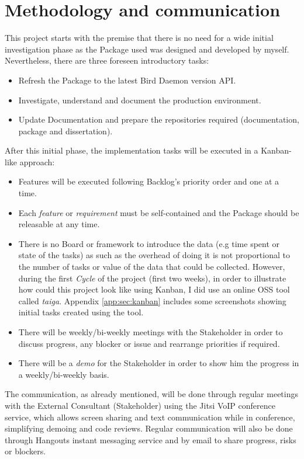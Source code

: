 \section{Methodology and communication}
This project starts with the premise that there is no need for a wide initial investigation phase as the Package used was designed and developed by myself. Nevertheless, there are three foreseen introductory tasks:
\begin{itemize}
    \item Refresh the Package to the latest Bird Daemon version API. 
    \item Investigate, understand and document the production environment.
    \item Update Documentation and prepare the repositories required (documentation, package and dissertation).
\end{itemize}

After this initial phase, the implementation tasks will be executed in a Kanban-like approach:
\begin{itemize}
    \item Features will be executed following Backlog's priority order and one at a time.
    \item Each \textit{feature} or \textit{requirement} must be self-contained and the Package should be releasable at any time.
    \item There is no Board or framework to introduce the data (e.g time spent or state of the tasks) as such as the overhead of doing it is not proportional to the number of tasks or value of the data that could be collected. However, during the first \textit{Cycle} of the project (first two weeks), in order to illustrate how could this project look like using Kanban, I did use an online OSS tool called \textit{\Gls{taiga}}. Appendix \ref{app:sec:kanban} includes some screenshots  showing initial tasks created using the tool.
    \item There will be weekly/bi-weekly meetings with the Stakeholder in order to discuss progress, any blocker or issue and rearrange priorities if required.
    \item There will be a \textit{demo} for the Stakeholder in order to show him the progress in a weekly/bi-weekly basis.
\end{itemize}

The communication, as already mentioned, will be done through regular meetings with the External Consultant (Stakeholder) using the Jitsi VoIP conference service, which allows screen sharing and text communication while in conference, simplifying demoing and code reviews. Regular communication will also be done through Hangouts instant messaging service and by email to share progress, risks or blockers.

